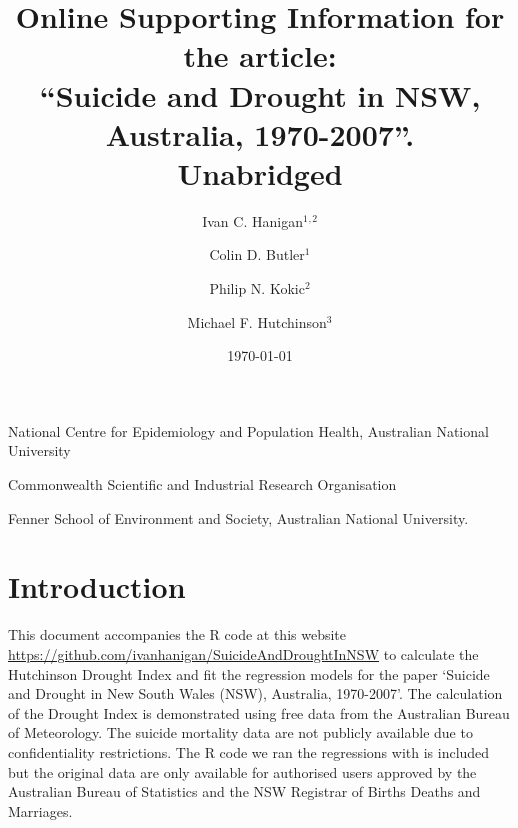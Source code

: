 \documentclass[a4paper]{article}                %
\begin{document}

\title{Online Supporting Information for the article:\\ ``Suicide and Drought in NSW, Australia, 1970-2007''.\\ Unabridged}
\author{Ivan C. Hanigan$^1$$^,$$^2$ \and Colin D. Butler$^1$ \and
  Philip N. Kokic$^2$ \and
  Michael F. Hutchinson$^3$}
\date{\today}
\maketitle


\noindent [$^1$]National Centre for Epidemiology and Population Health, Australian National University


\noindent [$^2$]Commonwealth Scientific and Industrial Research Organisation

\noindent [$^3$]Fenner School of Environment and Society, Australian National University.



\setcounter{page}{1}
\tableofcontents
{}
\setcounter{page}{1}

\doublespacing   %




\section{Introduction}

        This document accompanies the R code at this website \url{https://github.com/ivanhanigan/SuicideAndDroughtInNSW} to calculate the Hutchinson Drought Index and fit the regression models for the paper `Suicide and Drought in New South Wales (NSW), Australia, 1970-2007'.  The calculation of the Drought Index is demonstrated using free data from the Australian Bureau of Meteorology. The suicide mortality data are not publicly available due to confidentiality restrictions. The R code we ran the regressions with is included but the original data are only available for authorised users approved by the Australian Bureau of Statistics and the NSW Registrar of Births Deaths and Marriages.


\end{document}

